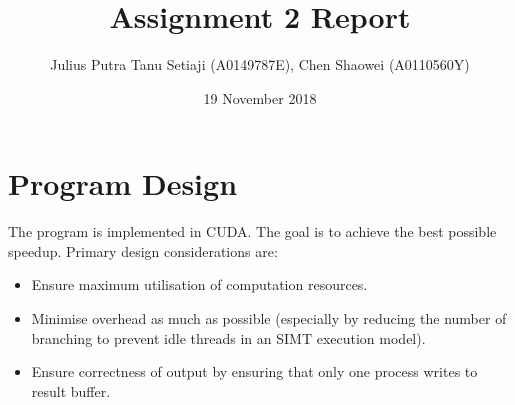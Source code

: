 \documentclass[a4paper,12pt]{article}
\title{Assignment 2 Report}
\author{Julius Putra Tanu Setiaji (A0149787E), Chen Shaowei (A0110560Y)}
\date{19 November 2018}
\begin{document}
\maketitle

\section{Program Design}
The program is implemented in CUDA. The goal is to achieve the best possible speedup. Primary design considerations are:
\begin{itemize}
  \item Ensure maximum utilisation of computation resources.
  \item Minimise overhead as much as possible (especially by reducing the number of branching to prevent idle threads in an SIMT execution model).
  \item Ensure correctness of output by ensuring that only one process writes to result buffer.
\end{itemize}
\end{document}
